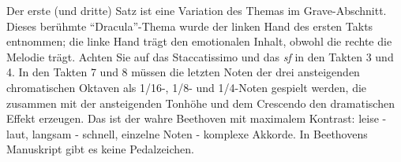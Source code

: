 Der erste (und dritte) Satz ist eine Variation des Themas im Grave-Abschnitt. 
Dieses berühmte \enquote{Dracula}-Thema wurde der linken Hand des ersten Takts entnommen; die linke Hand trägt den emotionalen Inhalt, obwohl die rechte die Melodie trägt.
Achten Sie auf das Staccatissimo und das \textit{sf} in den Takten 3 und 4.
In den Takten 7 und 8 müssen die letzten Noten der drei ansteigenden chromatischen Oktaven als 1/16-, 1/8- und 1/4-Noten gespielt werden, die zusammen mit der ansteigenden Tonhöhe und dem Crescendo den dramatischen Effekt erzeugen.
Das ist der wahre Beethoven mit maximalem Kontrast: leise - laut, langsam - schnell, einzelne Noten - komplexe Akkorde.
In Beethovens Manuskript gibt es keine Pedalzeichen.



